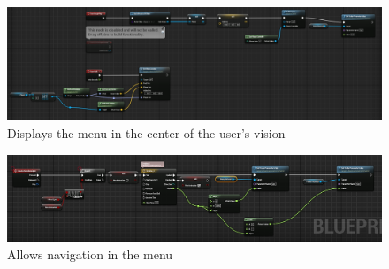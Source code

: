\documentclass[11pt]{book}
\begin{document}
	\begin{figure}
		\caption{Displays the menu in the center of the user's vision}
		\includegraphics[scale=0.5]{Menu1.png}
		\centering
	\end{figure}
	\begin{figure}
		\caption{Allows navigation in the menu}
		\includegraphics[scale=0.5]{Menu2.png}
		\centering
	\end{figure}
\end{document}
